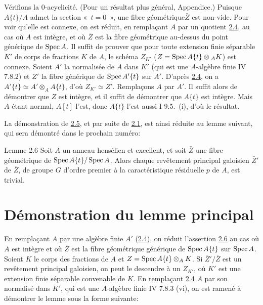 \documentclass[10pt]{../fichiers-configuration-latex/smfart}
\begin{document}
Vérifions la $0$-acyclicité. (Pour un résultat plus général, \cf
Appendice.) Puisque $A\{t\}/A$ admet la section « $t=0$ », une
fibre géométrique\pageoriginale $\bar{Z}$ est non-vide. Pour voir
qu'elle est connexe, on est réduit, en remplaçant $A$ par un
quotient \sisi{(}{}\hyperref[XV.cor2.4]{2.4}\sisi{)}{}, au cas où $A$ est intègre, et où $\bar{Z}$ est la fibre
géométrique au-dessus du point générique de $\operatorname{Spec} A$. Il suffit de
prouver que pour toute extension finie séparable $K'$ de corps de
fractions $K$ de $A$, le schéma $Z_{K'}$ ($Z=\operatorname{Spec} A\{t\}\otimes
{}_AK$) est connexe. Soient $A'$ la normalisée de $A$ dans $K'$ (qui
est une $A$-algèbre finie \sisi{(}{}\EGA IV 7.8.2\sisi{)}{})
et $Z'$ la fibre générique de $\operatorname{Spec} A'\{t\}$ sur $A'$. D'après \hyperref[XV.cor2.4]{2.4},
on a $A'\{t\}\simeq A'\otimes_A A\{t\}$, d'où $Z_{K'}\simeq Z'$. Remplaçons $A$ par $A'$. Il suffit
alors de démontrer que $Z$ est intègre, et il suffit de démontrer que
$A\{t\}$ est intègre. Mais $A$ étant normal, $A[t]$ l'est, donc
$A\{t\}$ l'est aussi \sisi{(}{} I 9.5.~(i)\sisi{)}{}, d'où le résultat.

La démonstration de \hyperref[XV.lem2.5]{2.5}, et par suite de \hyperref[XV.thm2.1]{2.1},
est ainsi réduite au lemme suivant, qui sera démontré dans le prochain numéro:

\begin{enonce*}{Lemme 2.6}
Soit $A$ un anneau hensélien et excellent, et soit $\bar{Z}$ une fibre
géométrique de $\operatorname{Spec} A\{t\}/\operatorname{Spec} A$. Alors chaque revêtement
principal galoisien $\bar{Z}'$ de $\bar{Z}$, de groupe $G$ d'ordre
premier à la caractéristique résiduelle $p$ de $A$, est trivial.
\end{enonce*}

\section{Démonstration du lemme principal}\pageoriginale

En remplaçant $A$ par une algèbre finie $A'$ (\cf \hyperref[XV.cor2.4]{2.4}), on réduit
l'assertion \hyperref[XV.lem2.6]{2.6} au cas où $A$ est intègre et où $\bar{Z}$ est la fibre
géométrique générique de $\operatorname{Spec} A\{t\}$ sur $\operatorname{Spec} A$. Soient $K$ le
corps des fractions de $A$ et $Z=\operatorname{Spec} A\{t\}\otimes_A K$. Si
$\bar{Z}'/\bar{Z}$ est un revêtement principal galoisien, on peut le
descendre à un $Z_{K'}$, où $K'$ est une extension finie séparable
convenable de $K$. En remplaçant \hyperref[XV.cor2.4]{2.4} $A$ par son normalisé dans
$K'$, qui est une $A$-algèbre finie \sisi{(}{}\EGA IV 7.8.3 (vi)\sisi{)}{}, on est ramené à
démontrer le lemme sous la forme suivante:
\end{document}
